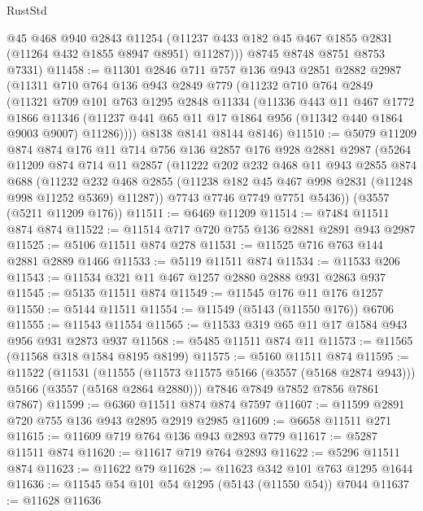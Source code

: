 \begin{lexlean}{RustStd}
\begin{coremodule}
          @45
          @468
          @940
          @2843
          @11254
          (@11237 @433 @182 @45 @467 @1855 @2831 (@11264 @432 @1855 @8947 @8951) @11287)))
      @8745
      @8748
      @8751
      @8753
      @7331)
@11458 := @11301
    @2846
    @711
    @757
    @136
    @943
    @2851
    @2882
    @2987
    (@11311
      @710
      @764
      @136
      @943
      @2849
      @779
      (@11232
        @710
        @764
        @2849
        (@11321
          @709
          @101
          @763
          @1295
          @2848
          @11334
          (@11336
            @443
            @11
            @467
            @1772
            @1866
            @11346
            (@11237 @441 @65 @11 @17 @1864 @956 (@11342 @440 @1864 @9003 @9007) @11286))))
      @8138
      @8141
      @8144
      @8146)
@11510 := @5079
    @11209
    @874
    @874
    @176
    @11
    @714
    @756
    @136
    @2857
    @176
    @928
    @2881
    @2987
    (@5264
      @11209
      @874
      @714
      @11
      @2857
      (@11222
        @202
        @232
        @468
        @11
        @943
        @2855
        @874
        @688
        (@11232 @232 @468 @2855 (@11238 @182 @45 @467 @998 @2831 (@11248 @998 @11252 @5369) @11287))
        @7743
        @7746
        @7749
        @7751
        @5436))
    (@3557 (@5211 @11209 @176))
@11511 := @6469 @11209
@11514 := @7484 @11511 @874 @874
@11522 := @11514 @717 @720 @755 @136 @2881 @2891 @943 @2987
@11525 := @5106 @11511 @874 @278
@11531 := @11525 @716 @763 @144 @2881 @2889 @1466
@11533 := @5119 @11511 @874
@11534 := @11533 @206
@11543 := @11534 @321 @11 @467 @1257 @2880 @2888 @931 @2863 @937
@11545 := @5135 @11511 @874
@11549 := @11545 @176 @11 @176 @1257
@11550 := @5144 @11511
@11554 := @11549 (@5143 (@11550 @176)) @6706
@11555 := @11543 @11554
@11565 := @11533 @319 @65 @11 @17 @1584 @943 @956 @931 @2873 @937
@11568 := @5485 @11511 @874 @11
@11573 := @11565 (@11568 @318 @1584 @8195 @8199)
@11575 := @5160 @11511 @874
@11595 := @11522
    (@11531
      (@11555 (@11573 @11575 @5166 (@3557 (@5168 @2874 @943))) @5166 (@3557 (@5168 @2864 @2880)))
      @7846
      @7849
      @7852
      @7856
      @7861
      @7867)
@11599 := @6360 @11511 @874 @874 @7597
@11607 := @11599 @2891 @720 @755 @136 @943 @2895 @2919 @2985
@11609 := @6658 @11511 @271
@11615 := @11609 @719 @764 @136 @943 @2893 @779
@11617 := @5287 @11511 @874
@11620 := @11617 @719 @764 @2893
@11622 := @5296 @11511 @874
@11623 := @11622 @79
@11628 := @11623 @342 @101 @763 @1295 @1644
@11636 := @11545 @54 @101 @54 @1295 (@5143 (@11550 @54)) @7044
@11637 := @11628 @11636

\end{coremodule}
\end{lexlean}
